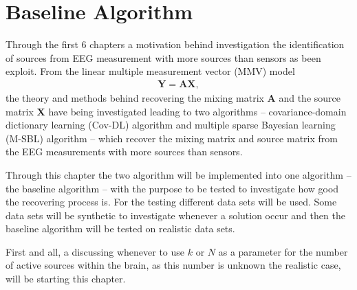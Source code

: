 \chapter{Baseline Algorithm}\label{ch:implementation}
Through the first 6 chapters a motivation behind investigation the identification of sources from EEG measurement with more sources than sensors as been exploit. From the linear multiple measurement vector (MMV) model
\begin{align*}
\mathbf{Y} = \mathbf{AX},
\end{align*}
the theory and methods behind recovering the mixing matrix $\mathbf{A}$ and the source matrix $\mathbf{X}$ have being investigated leading to two algorithms -- covariance-domain dictionary learning (Cov-DL) algorithm and multiple sparse Bayesian learning (M-SBL) algorithm -- which recover the mixing matrix and source matrix from the EEG measurements with more sources than sensors.

Through this chapter the two algorithm will be implemented into one algorithm -- the baseline algorithm -- with the purpose to be tested to investigate how good the recovering process is. 
For the testing different data sets will be used. Some data sets will be synthetic to investigate whenever a solution occur and then the baseline algorithm will be tested on realistic data sets.

First and all, a discussing whenever to use $k$ or $N$ as a parameter for the number of active sources within the brain, as this number is unknown the realistic case, will be starting this chapter.





    



